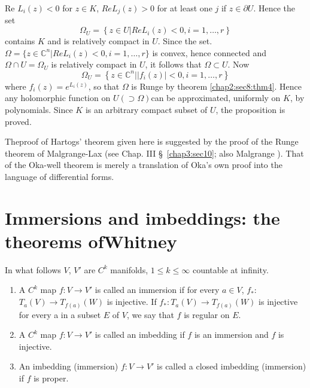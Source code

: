 Re $L_i (z) < 0$ for $z \in K$, $Re L_j(z) > 0$ for at least one $j$
if $z \in \partial U$. Hence the set 
$$
\Omega_U = \left\{z \in U \bigg| Re L_i(z) < 0, i = 1, \ldots, r \right\}
$$
contains $K$ and is relatively compact in $U$. Since the set. $\Omega
= \{ z \in \mathbb{C}^n \bigg| Re L_i (z) < 0, i = 1, \ldots , r\}$ is
convex, hence connected and $\Omega \cap U = \Omega_U$ is relatively
compact in $U$, it follows that $\Omega \subset U$. Now 
$$
\Omega_U = \left\{z \in \mathbb{C}^n \bigg| |f_i(z) |< 0, i = 1,
\ldots, r \right\} 
$$
where $f_i(z) = e^{L_i (z)}$, so that $\Omega$ is Runge by theorem
\ref{chap2:sec8:thm4}. Hence any holomorphic function on $U (\supset \Omega)$can be
approximated, uniformly on $K$, by polynomials. Since $K$ is an
arbitrary compact subset of $U$, the proposition is proved. 
 
The\pageoriginale proof of Hartogs' theorem given here is suggested by the proof of
the Runge theorem of Malgrange-Lax (see Chap. III \S\ \ref{chap3:sec10}; also
Malgrange \cite{27}). That of the Oka-well theorem is merely a translation
of Oka's own proof \cite{34} into the language of differential forms. 

\section[Immersions and imbeddings: the theorems of Whitney]{Immersions and 
imbeddings: the theorems of\hfil\break Whitney}\label{chap2:sec9}
 
In what follows $V$, $V'$ are $C^k$ manifolds, $1 \leq k \leq \infty$
countable at infinity. 

\begin{defis*}
  \begin{enumerate}[(1)]
  \item A $C^k$ map $f: V \rightarrow V'$ is called an immersion if
    for every $a \in V$, $f_* $: $T_a (V) \rightarrow T_{f(a)}(W)$ is
    injective. If $f_*: T_a (V) \rightarrow T_{f(a)}(W)$ is
    injective for every a in a subset $E$ of $V$, we say that $f$ is
    regular on $E$. 
  \item A $C^k$ map $f: V \rightarrow V'$ is called an imbedding if
    $f$ is an immersion and $f$ is injective. 
  \item An imbedding (immersion) $f: V \rightarrow V'$ is called a
    closed imbedding (immersion) if $f$ is proper. 
  \end{enumerate}
\end{defis*} 
 
